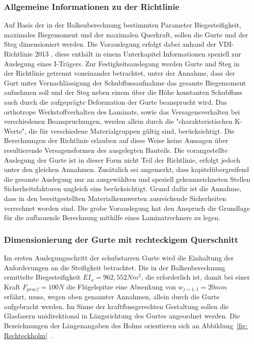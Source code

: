 \subsubsection{Allgemeine Informationen zu der Richtlinie}
Auf Basis der in der Balkenberechnung bestimmten Parameter Biegesteifigkeit, maximales Biegemoment und der maximalen Querkraft, sollen die Gurte und der Steg dimensioniert werden. Die Vorauslegung erfolgt dabei anhand der VDI-Richtlinie 2013 \cite{item5}, diese enthält in einem Unterkapitel Informationen speziell zur Auslegung eines I-Trägers. Zur Festigkeitsauslegung werden Gurte und Steg in der Richtlinie getrennt voneinander betrachtet, unter der Annahme, dass der Gurt unter Vernachlässigung der Schubflussaufnahme das gesamte Biegemoment aufnehmen soll und der Steg neben einem über die Höhe konstanten Schubfluss auch durch die aufgeprägte Deformation der Gurte beansprucht wird. Das orthotrope Werkstoffverhalten des Laminats, sowie das Versagensverhalten bei verschiedenen Beanspruchungen, werden allein durch die "charakteristischen K-Werte", die für verschiedene Materialgruppen gültig sind, berücksichtigt. Die Berechnungen der Richtlinie erlauben auf diese Weise keine Aussagen über resultierende Versagensformen des ausgelegten Bauteils. Die vorangestellte Auslegung der Gurte ist in dieser Form nicht Teil der Richtlinie, erfolgt jedoch unter den gleichen Annahmen.     
Zusätzlich sei angemerkt, dass kapitelübergreifend die gesamte Auslegung nur an ausgewählten und speziell gekennzeichneten Stellen Sicherheitsfaktoren ungleich eins berücksichtigt. Grund dafür ist die Annahme, dass in den bereitgestellten Materialkennwerten ausreichende Sicherheiten verrechnet worden sind. Die grobe Vorauslegung hat den Anspruch die Grundlage für die aufbauende Berechnung mithilfe eines Laminatrechners zu legen.

\subsubsection{Dimensionierung der Gurte mit rechteckigem Querschnitt}
\label{GurtDim} 
Im ersten Auslegungsschritt der schubstarren Gurte wird die Einhaltung der Anforderungen an die Steifigkeit betrachtet.   
Die in der Balkenberechnung ermittelte Biegesteifigkeit $ EI_{x} = 962,552 Nm^{2} $, die erforderlich ist, damit bei einer Kraft $ F_{pruef}=100N $ die Flügelspitze eine Absenkung von $ w_{j=1,1}=20mm $ erfährt, muss, wegen oben genannter Annahmen, allein durch die Gurte aufgebracht werden. Im Sinne der kraftflussgerechten Gestaltung sollen die Glasfasern unidirektional in Längsrichtung des Gurtes angeordnet werden. Die Bezeichnungen der Längenangaben des Holms orientieren sich an Abbildung~\ref{fig: Rechteckholm}~.\\

